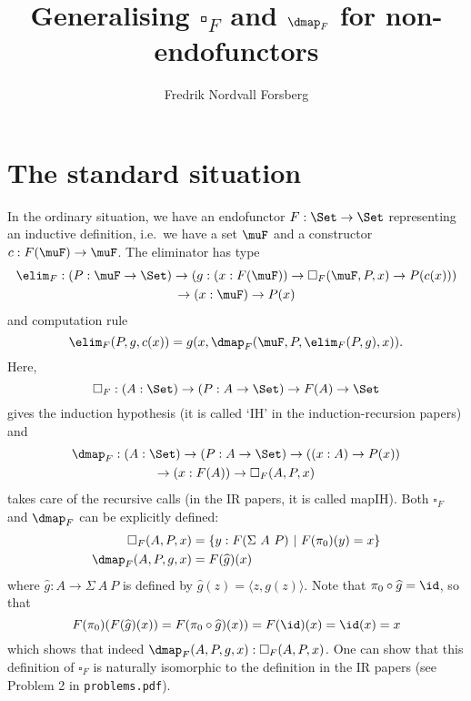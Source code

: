 \documentclass{article}
\title{Generalising $\square_F$ and $\dmap_F$ for non-endofunctors}
\author{Fredrik Nordvall Forsberg}
\begin{document}
\maketitle

\section{The standard situation}

In the ordinary situation, we have an endofunctor $F : \Set \to \Set$
representing an inductive definition, i.e.\ we have a set $\muF$ and a
constructor $c : F(\muF) \to \muF$. The eliminator has type
\begin{multline*}
\elim_F : (P : \muF \to \Set) \to (g : (x : F(\muF)) \to \square_F(\muF, P,x)
   \to P(c(x))) \\ \to (x : \muF) \to P(x)
\end{multline*}
and computation rule
\[
\elim_F(P, g, c(x)) = g(x, \dmap_F(\muF, P, \elim_F(P, g), x)).
\]
Here, 
\[
\square_F : (A : \Set) \to (P : A \to \Set) \to F(A) \to \Set
\]
gives the induction hypothesis (it is called `IH' in the
induction-recursion papers) and
\begin{multline*}
  \dmap_F : (A : \Set) \to (P : A \to \Set) \to ((x : A) \to P(x)) \\
  \to (x : F(A)) \to \square_F(A, P, x)
\end{multline*}
takes care of the recursive calls (in the IR papers, it is called
mapIH). Both $\square_F$ and $\dmap_F$ can be explicitly defined:
\begin{align*}
\square_F(A, P, x) &= \{ y : F(\Sigma\ A\ P)\ |\ F(\pi_0)(y) = x \} \\
\dmap_F(A, P, g, x) &= F(\widehat{g})(x)
\end{align*}
where $\widehat{g} : A \to \Sigma\ A \ P$ is defined by
$\widehat{g}(z) = \langle z , g(z)\rangle$. Note that $\pi_0 \circ
\widehat{g} = \id$, so that
\[
F(\pi_0)(F(\widehat{g})(x)) = F(\pi_0 \circ \widehat{g})(x))
                            = F(\id)(x)
                            = \id(x)
                            = x
\]
which shows that indeed $\dmap_F(A, P, g, x) : \square_F(A, P, x)$.
One can show that this definition of $\square_F$ is naturally
isomorphic to the definition in the IR papers (see Problem 2 in
\texttt{problems.pdf}).
\end{document}

